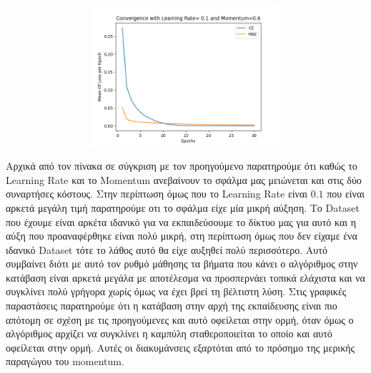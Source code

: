 \documentclass[12pt,a4paper]{article}
\newcommand{\tl}{\textlatin}
\begin{document}
        \begin{figure}[h]
            \raggedright
            \begin{subfigure}[t]{0.5\textwidth}
               \includegraphics[width=10cm,height=5.2cm,left]{images/0.1_0.6.png}
            \end{subfigure}
        \end{figure}
        Αρχικά από τον πίνακα σε σύγκριση με τον προηγούμενο παρατηρούμε ότι καθώς το \tl{Learning Rate} και το \tl{Momentum} ανεβαίνουν το σφάλμα μας μειώνεται και στις δύο συναρτήσες κόστους. Στην περίπτωση όμως που το \tl{Learning Rate} είναι $0.1$ που είναι αρκετά μεγάλη τιμή παρατηρούμε οτι το σφάλμα είχε μία μικρή αύξηση. Το \tl{Dataset} που έχουμε είναι αρκέτα ιδανικό για να εκπαιδεύσουμε το δίκτυο μας για αυτό και η αύξη που προαναφέρθηκε είναι πολύ μικρή, στη περίπτωση όμως που δεν είχαμε ένα ιδανικό \tl{Dataset} τότε το λάθος αυτό θα είχε αυξηθεί πολύ περισσότερο. Αυτό συμβαίνει διότι με αυτό τον ρυθμό μάθησης τα βήματα που κάνει ο αλγόριθμος στην κατάβαση είναι αρκετά μεγάλα με αποτέλεσμα να προσπερνάει τοπικά ελάχιστα και να συγκλίνει πολύ γρήγορα χωρίς όμως να έχει βρεί τη βέλτιστη λύση. Στις γραφικές παραστάσεις παρατηρούμε ότι η κατάβαση στην αρχή της εκπαίδευσης είναι πιο απότομη σε σχέση με τις προηγούμενες και αυτό οφείλεται στην ορμή, όταν όμως ο αλγόριθμος αρχίζει να συγκλίνει η καμπύλη σταθεροποιείται το οποίο και αυτό οφείλεται στην ορμή. Αυτές οι διακυμάνσεις εξαρτόται από το πρόσημο της μερικής παραγώγου του \tl{momentum}.
\end{document}
